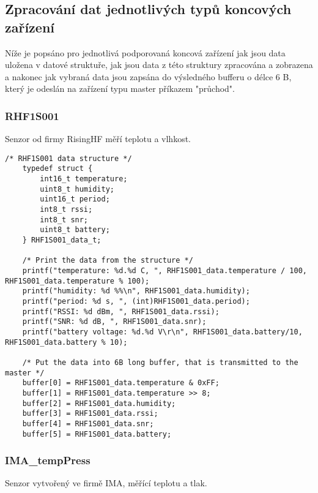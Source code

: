 \subsection{Zpracování dat jednotlivých typů koncových zařízení}
Níže je popsáno pro jednotlivá podporovaná koncová zařízení jak jsou data uložena v datové struktuře, jak jsou data z této struktury zpracována a zobrazena a nakonec jak vybraná data jsou zapsána do výsledného bufferu o délce 6 B, který je odeslán na zařízení typu master příkazem "průchod".

\subsubsection{RHF1S001}
Senzor od firmy RisingHF měří teplotu a vlhkost.

\begin{lstlisting}[style=CStyle]
    /* RHF1S001 data structure */   
    typedef struct {
        int16_t temperature;
        uint8_t humidity;
        uint16_t period;
        int8_t rssi;
        int8_t snr;
        uint8_t battery;
    } RHF1S001_data_t;

    /* Print the data from the structure */
	printf("temperature: %d.%d C, ", RHF1S001_data.temperature / 100, RHF1S001_data.temperature % 100);
	printf("humidity: %d %%\n", RHF1S001_data.humidity);
	printf("period: %d s, ", (int)RHF1S001_data.period);
	printf("RSSI: %d dBm, ", RHF1S001_data.rssi);
	printf("SNR: %d dB, ", RHF1S001_data.snr);
	printf("battery voltage: %d.%d V\r\n", RHF1S001_data.battery/10, RHF1S001_data.battery % 10);

    /* Put the data into 6B long buffer, that is transmitted to the master */
	buffer[0] = RHF1S001_data.temperature & 0xFF;
	buffer[1] = RHF1S001_data.temperature >> 8;
	buffer[2] = RHF1S001_data.humidity;
	buffer[3] = RHF1S001_data.rssi;
	buffer[4] = RHF1S001_data.snr;
	buffer[5] = RHF1S001_data.battery;
\end{lstlisting}


\subsubsection{IMA\_tempPress}
Senzor vytvořený ve firmě IMA, měřící teplotu a tlak.

